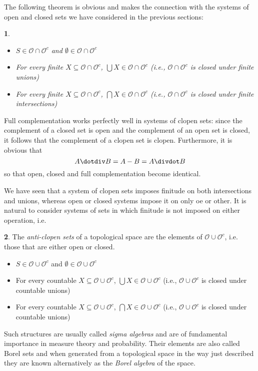 \documentclass[oneside,english]{article}
\theoremstyle{plain}
\newtheorem{thm}{\protect\theoremname}
\theoremstyle{definition}
\newtheorem{defn}[thm]{\protect\definitionname}
\theoremstyle{definition}
\providecommand{\definitionname}{Definition}
\providecommand{\theoremname}{Theorem}
\begin{document}
The following theorem is obvious and makes the connection with the systems of open and closed sets we have considered in the previous sections:
\begin{thm}
	\begin{itemize}
		\item $S\in\mathscr{O}\cap \mathscr{O}^c$ and $\emptyset\in\mathscr{O}\cap \mathscr{O}^c$
		\item For every finite $X\subseteq\mathscr{O}\cap \mathscr{O}^c$, $\bigcup X\in \mathscr{O}\cap \mathscr{O}^c$ (i.e., $\mathscr{O}\cap \mathscr{O}^c$ is closed under finite unions)
		\item For every finite $X\subseteq\mathscr{O}\cap \mathscr{O}^c$, $\bigcap X\in \mathscr{O}\cap \mathscr{O}^c$ (i.e., $\mathscr{O}\cap \mathscr{O}^c$ is closed under finite intersections)
	\end{itemize}
\end{thm}

Full complementation works perfectly well in systems of clopen sets: since the complement of a closed set is open and the complement of an open set is closed, it follows that the complement of a clopen set is clopen. Furthermore, it is obvious that
\[
	A\dotdiv B = A - B = A\divdot B
\]
so that open, closed and full complementation become identical.

We have seen that a system of clopen sets imposes finitude on both intersections and unions, whereas open or closed systems impose it on only oe or other. It is natural to consider systems of sets in which finitude is not imposed on either operation, i.e.
\begin{defn}
	The \emph{anti-clopen sets} of a topological space are the elements of $\mathscr{O}\cup \mathscr{O}^c$, i.e. those that are either open or closed.
	\begin{itemize}
		\item $S\in\mathscr{O}\cup \mathscr{O}^c$ and $\emptyset\in\mathscr{O}\cup \mathscr{O}^c$
		\item For every countable $X\subseteq\mathscr{O}\cup \mathscr{O}^c$, $\bigcup X\in \mathscr{O}\cup \mathscr{O}^c$ (i.e., $\mathscr{O}\cup \mathscr{O}^c$ is closed under countable unions)
		\item For every countable $X\subseteq\mathscr{O}\cup \mathscr{O}^c$, $\bigcap X\in \mathscr{O}\cup \mathscr{O}^c$ (i.e., $\mathscr{O}\cup \mathscr{O}^c$ is closed under countable unions)
	\end{itemize}
\end{defn}
Such structures are usually called \emph{sigma algebras} and are of fundamental importance in measure theory and probability. Their elements are also called Borel sets and when generated from a topological space in the way just described they are known alternatively as the \emph{Borel algebra} of the space.
\end{document}
